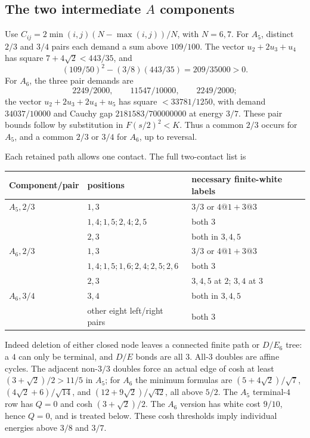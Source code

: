 \documentclass[11pt]{article}
\theoremstyle{definition}
\theoremstyle{remark}
\begin{document}
\subsection[The two intermediate A components]{The two intermediate \texorpdfstring{$A$}{A} components}

Use $C_{ij}=2\min(i,j)(N-\max(i,j))/N$, with $N=6,7$.
For $A_5$, distinct $2/3$ and $3/4$ pairs each demand a sum above
$109/100$. The vector $u_2+2u_3+u_4$ has square
$7+4\sqrt2<443/35$, and
\[
(109/50)^2-(3/8)(443/35)=209/35000>0.
\]
For $A_6$, the three pair demands are
\[
2249/2000,\qquad11547/10000,\qquad2249/2000;
\]
the vector $u_2+2u_3+2u_4+u_5$ has square
$<33781/1250$, with demand $34037/10000$ and Cauchy gap
$2181583/700000000$ at energy $3/7$.
These pair bounds follow by substitution in
$F(s/2)^2<K$. Thus a common $2/3$ occurs for $A_5$, and a common
$2/3$ or $3/4$ for $A_6$, up to reversal.

Each retained path allows one contact. The full two-contact list is
\begin{center}\small
\begin{tabular}{lll}
\toprule
Component/pair&positions&necessary finite-white labels\\ \midrule
$A_5,2/3$&$1,3$&$3/3$ or $4@1+3@3$\\
&$1,4;1,5;2,4;2,5$&both $3$\\
&$2,3$&both in $3,4,5$\\
$A_6,2/3$&$1,3$&$3/3$ or $4@1+3@3$\\
&$1,4;1,5;1,6;2,4;2,5;2,6$&both $3$\\
&$2,3$&$3,4,5$ at $2$; $3,4$ at $3$\\
$A_6,3/4$&$3,4$&both in $3,4,5$\\
&other eight left/right pairs&both $3$\\ \bottomrule
\end{tabular}\end{center}
Indeed deletion of either closed node leaves a connected finite
path or $D/E_6$ tree: a $4$ can only be terminal, and $D/E$ bonds
are all $3$. All-$3$ doubles are affine cycles. The adjacent
non-$3/3$ doubles force an actual edge of cosh at least
$(3+\sqrt2)/2>11/5$ in $A_5$; for $A_6$ the minimum formulas are
$(5+4\sqrt2)/\sqrt7$, $(4\sqrt2+6)/\sqrt{14}$, and
$(12+9\sqrt2)/\sqrt{42}$, all above $5/2$.
The $A_5$ terminal-$4$ row has $Q=0$ and cosh
$(3+\sqrt2)/2$. The $A_6$ version has white cost $9/10$, hence
$Q=0$, and is treated below. These cosh thresholds imply individual
energies above $3/8$ and $3/7$.
\end{document}
